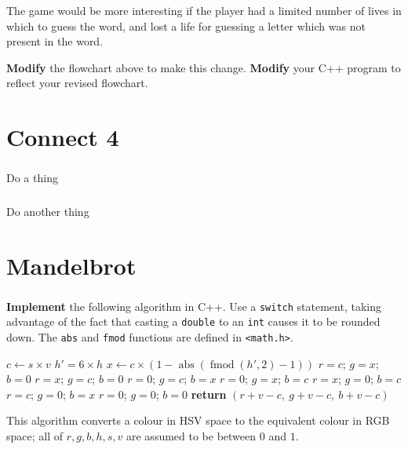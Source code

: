 \documentclass{scrartcl}
\begin{document}
The game would be more interesting if the player had a limited number of lives in which to guess the word,
and lost a life for guessing a letter which was not present in the word.

\textbf{Modify} the flowchart above to make this change. \textbf{Modify} your C++ program to reflect your revised flowchart.

\clearpage
\part{Connect 4}

\section{}
Do a thing

\section{}
Do another thing

\clearpage
\part{Mandelbrot}

\section{}

\textbf{Implement} the following algorithm in C++. Use a \lstinline{switch} statement,
taking advantage of the fact that casting a \lstinline{double} to an \lstinline{int} causes it to be rounded down.
The \lstinline{abs} and \lstinline{fmod} functions are defined in \lstinline{<math.h>}.

\begin{algorithm}
\begin{algorithmic}
		\State $c \gets s \times v$
		\State $h' = 6 \times h$
		\State $x \gets c \times \left(1 - \operatorname{abs} \left( \operatorname{fmod} \left( h', 2 \right) - 1 \right) \right)$
		     \State $r = c$; $g = x$; $b = 0$
		  \State $r = x$; $g = c$; $b = 0$
		  \State $r = 0$; $g = c$; $b = x$
		  \State $r = 0$; $g = x$; $b = c$
		  \State $r = x$; $g = 0$; $b = c$
		  \State $r = c$; $g = 0$; $b = x$
		\Else                    \State $r = 0$; $g = 0$; $b = 0$
		\EndIf
		\State \textbf{return} $(r+v-c,\ g+v-c,\ b+v-c)$
	\EndProcedure
\end{algorithmic}
\end{algorithm}

This algorithm converts a colour in HSV space to the equivalent colour in RGB space;
all of $r,g,b,h,s,v$ are assumed to be between $0$ and $1$.
\end{document}
